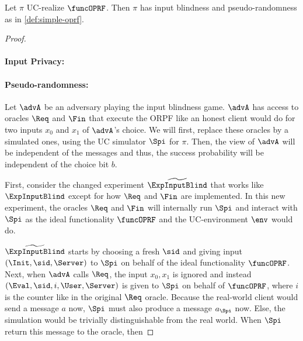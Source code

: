 
\begin{theorem}
 Let $\pi$ UC-realize $\funcOPRF$. Then $\pi$ has input blindness and pseudo-randomness as in \cref{def:simple-oprf}.
\end{theorem}
\begin{proof}
\paragraph{Input Privacy:}

\paragraph{Pseudo-randomness:}
Let $\advA$ be an adversary playing the input blindness game. $\advA$ has access to oracles $\Req$ and $\Fin$
that execute the ORPF like an honest client would do for two inputs $x_0$ and $x_1$ of $\advA$'s choice. 
We will first, replace these oracles by a simulated ones, using the UC simulator $\Spi$ for $\pi$. Then, the view of $\advA$ will be independent of the messages and thus, the success probability will be independent of the choice bit $b$.

First, consider the changed experiment $\widetilde\ExpInputBlind$
that works like $\ExpInputBlind$ except for how $\Req$ and $\Fin$
are implemented.
In this new experiment, the oracles $\Req$ and $\Fin$ will internally run $\Spi$ and interact with $\Spi$ as the ideal functionality $\funcOPRF$ and the UC-environment $\env$ would do.

$\widetilde\ExpInputBlind$ starts by choosing a fresh $\sid$ and giving input $(\Init,\sid,\Server)$ to $\Spi$ on behalf of the ideal functionality $\funcOPRF$. 
Next, when $\advA$ calls $\Req$, the input $x_0,x_1$ is ignored and instead $(\Eval,\sid,i,\User,\Server)$ is given to $\Spi$ on behalf of $\funcOPRF$, where $i$ is the counter like in the original $\Req$ oracle.
Because the real-world client would send a message $a$ now, $\Spi$ must also produce a message $a_{\Spi}$ now. Else, the simulation would be trivially distinguishable from the real world.
When $\Spi$ return this message to the oracle, then 

\end{proof}